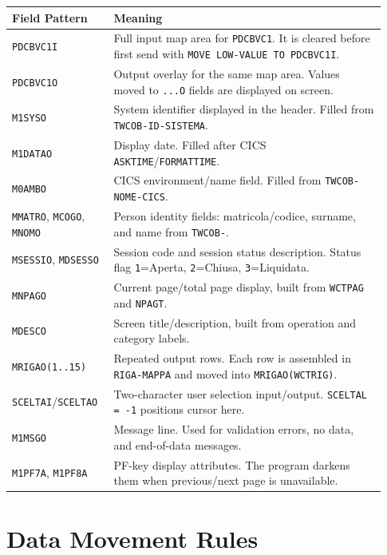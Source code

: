 \documentclass[11pt,a4paper]{article}
\begin{document}
\begin{longtable}{>{\raggedright\arraybackslash}p{0.24\linewidth} >{\raggedright\arraybackslash}p{0.69\linewidth}}
\textbf{Field Pattern} & \textbf{Meaning} \\
\hline
\texttt{PDCBVC1I} & Full input map area for \texttt{PDCBVC1}. It is cleared before first send with \texttt{MOVE LOW-VALUE TO PDCBVC1I}. \\
\texttt{PDCBVC1O} & Output overlay for the same map area. Values moved to \texttt{...O} fields are displayed on screen. \\
\texttt{M1SYSO} & System identifier displayed in the header. Filled from \texttt{TWCOB-ID-SISTEMA}. \\
\texttt{M1DATAO} & Display date. Filled after CICS \texttt{ASKTIME}/\texttt{FORMATTIME}. \\
\texttt{M0AMBO} & CICS environment/name field. Filled from \texttt{TWCOB-NOME-CICS}. \\
\texttt{MMATRO}, \texttt{MCOGO}, \texttt{MNOMO} & Person identity fields: matricola/codice, surname, and name from \texttt{TWCOB-}. \\
\texttt{MSESSIO}, \texttt{MDSESSO} & Session code and session status description. Status flag \texttt{1}=Aperta, \texttt{2}=Chiusa, \texttt{3}=Liquidata. \\
\texttt{MNPAGO} & Current page/total page display, built from \texttt{WCTPAG} and \texttt{NPAGT}. \\
\texttt{MDESCO} & Screen title/description, built from operation and category labels. \\
\texttt{MRIGAO(1..15)} & Repeated output rows. Each row is assembled in \texttt{RIGA-MAPPA} and moved into \texttt{MRIGAO(WCTRIG)}. \\
\texttt{SCELTAI}/\texttt{SCELTAO} & Two-character user selection input/output. \texttt{SCELTAL = -1} positions cursor here. \\
\texttt{M1MSGO} & Message line. Used for validation errors, no data, and end-of-data messages. \\
\texttt{M1PF7A}, \texttt{M1PF8A} & PF-key display attributes. The program darkens them when previous/next page is unavailable. \\
\end{longtable}

\section*{Data Movement Rules}
\end{document}
